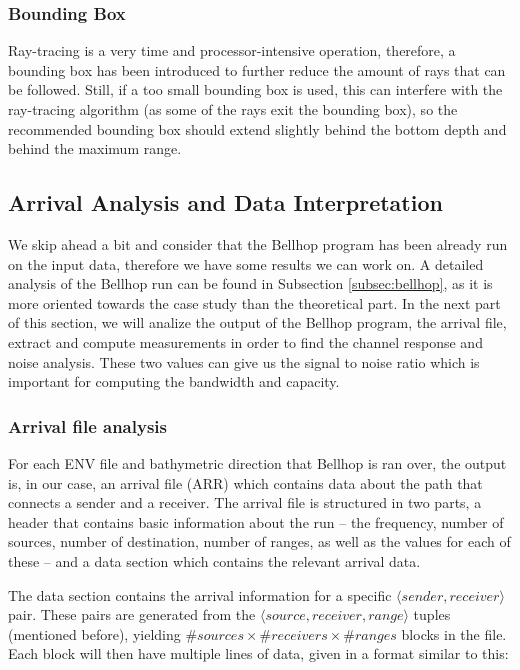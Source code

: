 \documentclass[a4paper]{IEEEtran}
\begin{document}
\subsubsection{Bounding Box}
Ray-tracing is a very time and processor-intensive operation,
therefore, a bounding box has been introduced to further reduce the
amount of rays that can be followed. Still, if a too small bounding
box is used, this can interfere with the ray-tracing algorithm (as
some of the rays exit the bounding box), so the recommended bounding
box should extend slightly behind the bottom depth and behind the
maximum range.
\subsection{Arrival Analysis and Data Interpretation}
We skip ahead a bit and consider that the Bellhop program has been
already run on the input data, therefore we have some results we can work
on. A detailed analysis of the Bellhop run can be found in Subsection
\ref{subsec:bellhop}, as it is more oriented towards the case study
than the theoretical part. In the next part of this section, we will
analize the output of the Bellhop program, the arrival file, extract
and compute measurements in order to find the channel response and
noise analysis. These two values can give us the signal to noise
ratio which is important for computing the bandwidth and capacity.

\subsubsection{Arrival file analysis}
For each ENV file and bathymetric direction that Bellhop is ran over,
the output is, in our case, an arrival file (ARR) which contains data
about the path that connects a sender and a receiver. The arrival file
is structured in two parts, a header that contains basic information
about the run -- the frequency, number of sources, number of
destination, number of ranges, as well as the values for each of these
-- and a data section which contains the relevant arrival data.

The data section contains the arrival information for a specific
$\langle sender, receiver \rangle$ pair. These pairs are generated from the
$\langle source,receiver,range \rangle$ tuples (mentioned before),
yielding $\#sources \times \#receivers \times \#ranges$ blocks in the
file. Each block will then have multiple lines of data, given in a
format similar to this:\\
\end{document}
